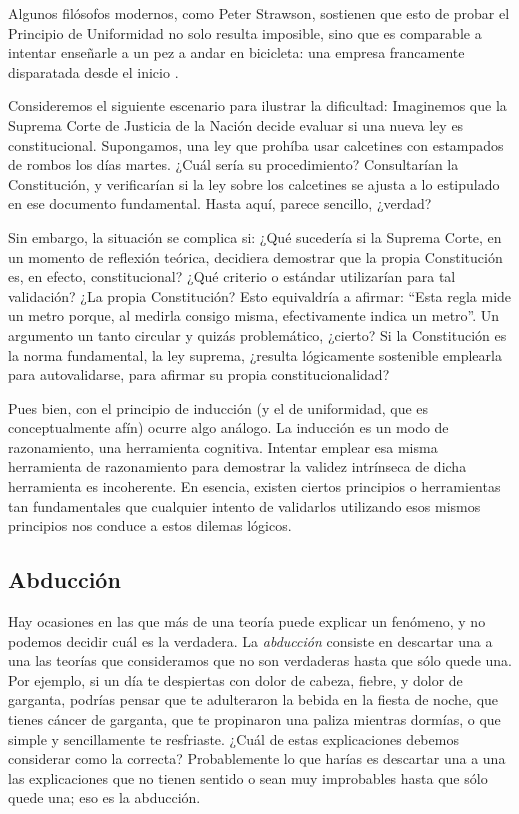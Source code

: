 Algunos filósofos modernos, como Peter Strawson, sostienen que esto de probar el
Principio de Uniformidad no solo resulta imposible, sino que es comparable a
intentar enseñarle a un pez a andar en bicicleta: una empresa francamente
disparatada desde el inicio \cite{Strawson2012}.

Consideremos el siguiente escenario para ilustrar la dificultad:
Imaginemos que la Suprema Corte de Justicia de la Nación decide evaluar si una
nueva ley es constitucional.
Supongamos, una ley que prohíba usar calcetines con estampados de rombos los
días martes.
¿Cuál sería su procedimiento? Consultarían la Constitución, y verificarían si la
ley sobre los calcetines se ajusta a lo estipulado en ese documento fundamental.
Hasta aquí, parece sencillo, ¿verdad?

Sin embargo, la situación se complica si:
¿Qué sucedería si la Suprema Corte, en un momento de reflexión teórica,
decidiera demostrar que la propia Constitución es, en efecto, constitucional?
¿Qué criterio o estándar utilizarían para tal validación?
¿La propia Constitución?
Esto equivaldría a afirmar: ``Esta regla mide un metro porque,
al medirla consigo misma, efectivamente indica un metro''.
Un argumento un tanto circular y quizás problemático, ¿cierto?
Si la Constitución es la norma fundamental, la ley suprema,
¿resulta lógicamente sostenible emplearla para autovalidarse, para afirmar su
propia constitucionalidad?

Pues bien, con el principio de inducción (y el de uniformidad, que es
conceptualmente afín) ocurre algo análogo.
La inducción es un modo de razonamiento, una herramienta cognitiva.
Intentar emplear esa misma herramienta de razonamiento para demostrar la validez
intrínseca de dicha herramienta es incoherente.
En esencia, existen ciertos principios o herramientas tan fundamentales que
cualquier intento de validarlos utilizando esos mismos principios nos conduce a
estos dilemas lógicos.


\subsection*{Abducción}
\label{sub:abduccion}
Hay ocasiones en las que más de una teoría puede explicar un fenómeno, y no
podemos decidir cuál es la verdadera.
La  \emph{abducción} consiste en descartar una a una las teorías que
consideramos que no son verdaderas hasta que sólo quede una.
Por ejemplo, si un día te despiertas con dolor de cabeza, fiebre, y dolor de
garganta, podrías pensar que te adulteraron la bebida en la fiesta de noche, que
tienes cáncer de garganta, que te propinaron una paliza mientras dormías, o que
simple y sencillamente te resfriaste.
¿Cuál de estas explicaciones debemos considerar como la correcta?
Probablemente lo que harías es descartar una a una las explicaciones que no
tienen sentido o sean muy improbables hasta que sólo quede una; eso es la
abducción.

